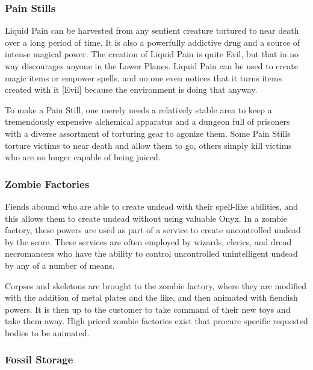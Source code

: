 \subsubsection{Pain Stills}

Liquid Pain can be harvested from any sentient creature tortured to near death over a long period of time. It is also a powerfully addictive drug and a source of intense magical power. The creation of Liquid Pain is quite Evil, but that in no way discourages anyone in the Lower Planes. Liquid Pain can be used to create magic items or empower spells, and no one even notices that it turns items created with it [Evil] because the environment is doing that anyway.

To make a Pain Still, one merely needs a relatively stable area to keep a tremendously expensive alchemical apparatus and a dungeon full of prisoners with a diverse assortment of torturing gear to agonize them. Some Pain Stills torture victims to near death and allow them to go, others simply kill victims who are no longer capable of being juiced.


\subsubsection{Zombie Factories}

Fiends abound who are able to create undead with their spell-like abilities, and this allows them to create undead without using valuable Onyx. In a zombie factory, these powers are used as part of a service to create uncontrolled undead by the score. These services are often employed by wizards, clerics, and dread necromancers who have the ability to control uncontrolled unintelligent undead by any of a number of means.

Corpses and skeletons are brought to the zombie factory, where they are modified with the addition of metal plates and the like, and then animated with fiendish powers. It is then up to the customer to take command of their new toys and take them away. High priced zombie factories exist that procure specific requested bodies to be animated.


\subsubsection{Fossil Storage}

